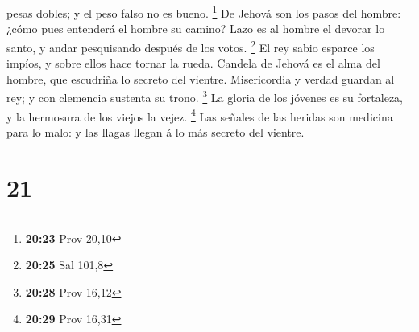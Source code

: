 pesas dobles; y el peso falso no es bueno. \footnote{\textbf{20:23} Prov
  20,10}  De Jehová son los pasos del hombre: ¿cómo pues
entenderá el hombre su camino?  Lazo es al hombre el
devorar lo santo, y andar pesquisando después de los votos. \footnote{\textbf{20:25}
  Sal 101,8}  El rey sabio esparce los impíos, y sobre
ellos hace tornar la rueda.  Candela de Jehová es el alma
del hombre, que escudriña lo secreto del vientre. 
Misericordia y verdad guardan al rey; y con clemencia sustenta su trono.
\footnote{\textbf{20:28} Prov 16,12}  La gloria de los
jóvenes es su fortaleza, y la hermosura de los viejos la vejez.
\footnote{\textbf{20:29} Prov 16,31}  Las señales de las
heridas son medicina para lo malo: y las llagas llegan á lo más secreto
del vientre.

\hypertarget{section-20}{%
\section{21}\label{section-20}}

